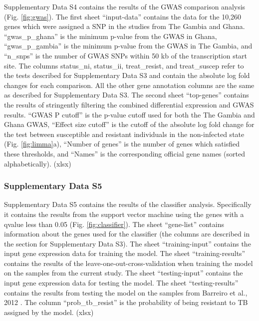 \documentclass[fleqn,10pt]{wlscirep}
\begin{document}
Supplementary Data S4 contains the results of the GWAS comparison
analysis (Fig. \ref{fig:gwas}). The first sheet “input-data” contains
the data for the 10,260 genes which were assigned a SNP in the studies
from The Gambia and Ghana. “gwas\_p\_ghana” is the minimum p-value
from the GWAS in Ghana, “gwas\_p\_gambia” is the minimum p-value from
the GWAS in The Gambia, and “n\_snps” is the number of GWAS SNPs
within 50 kb of the transcription start site. The columns status\_ni,
status\_ii, treat\_resist, and treat\_suscep refer to the tests
described for Supplementary Data S3 and contain the absolute log fold
changes for each comparison. All the other gene annotation columns are
the same as described for Supplementary Data S3. The second sheet
“top-genes” contains the results of stringently filtering the combined
differential expression and GWAS results. “GWAS P cutoff” is the
p-value cutoff used for both the The Gambia and Ghana GWAS, “Effect
size cutoff” is the cutoff of the absolute log fold change for the
test between susceptible and resistant individuals in the non-infected
state (Fig. \ref{fig:limma}a), “Number of genes” is the number of
genes which satisfied these thresholds, and “Names” is the
corresponding official gene names (sorted alphabetically). (xlsx)
\subsubsection*{Supplementary Data S5}

Supplementary Data S5 contains the results of the classifier analysis.
Specifically it contains the results from the support vector machine
using the genes with a qvalue less than 0.05 (Fig.
\ref{fig:classifier}). The sheet “gene-list” contains information
about the genes used for the classifier (the columns are described in
the section for Supplementary Data S3). The sheet “training-input”
contains the input gene expression data for training the model. The
sheet “training-results” contains the results of the
leave-one-out-cross-validation when training the model on the samples
from the current study.  The sheet “testing-input” contains the input
gene expression data for testing the model. The sheet
“testing-results” contains the results from testing the model on the
samples from Barreiro et al., 2012 \cite{Barreiro2012}. The column
“prob\_tb\_resist” is the probability of being resistant to TB
assigned by the model. (xlsx)
\end{document}

